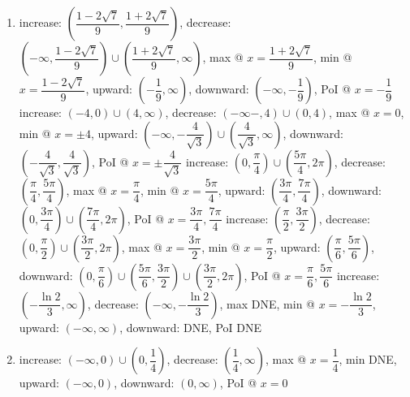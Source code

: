 \documentclass{book}
\begin{document}
\begin{appendices}
\begin{enumerate}[!HW!]
\itemspade increase: $(-\infty,-4)\cup(3,\infty)$,  decrease: $(-4,3)$, max @ $x=-4$, min @ $x=3$, upward: $\left(-\dfrac{1}{2},\infty\right)$, downward: $\left(-\infty,-\dfrac{1}{2}\right)$, PoI @ $x=-\dfrac{1}{2}$
\itemspade increase: $(-\infty,-2)\cup(1,\infty)$,  decrease: $(-2,1)$, max @ $x=-2$, min @ $x=1$, upward: $\left(-\dfrac{1}{2},\infty\right)$, downward: $\left(-\infty,-\dfrac{1}{2}\right)$, PoI @ $x=-\dfrac{1}{2}$
\item increase: $\left(\dfrac{1-2\sqrt{7}}{9},\dfrac{1+2\sqrt{7}}{9}\right)$, decrease: $\left(-\infty,\dfrac{1-2\sqrt{7}}{9}\right)\cup\left(\dfrac{1+2\sqrt{7}}{9},\infty\right)$, max @ $x=\dfrac{1+2\sqrt{7}}{9}$, min @ $x=\dfrac{1-2\sqrt{7}}{9}$, upward: $\left(-\dfrac{1}{9},\infty\right)$, downward: $\left(-\infty,-\dfrac{1}{9}\right)$, PoI @ $x=-\dfrac{1}{9}$
\itemspade increase: $(-4,0)\cup(4,\infty)$,  decrease: $(-\infty-,4)\cup(0,4)$, max @ $x=0$, min @ $x=\pm4$, upward: $\left(-\infty,-\dfrac{4}{\sqrt{3}}\right)\cup\left(\dfrac{4}{\sqrt{3}},\infty\right)$, downward: $\left(-\dfrac{4}{\sqrt{3}},\dfrac{4}{\sqrt{3}}\right)$, PoI @ $x=\pm\dfrac{4}{\sqrt{3}}$
\itemspade increase: $\left(0,\dfrac{\pi}{4}\right)\cup\left(\dfrac{5\pi}{4},2\pi\right)$,  decrease: $\left(\dfrac{\pi}{4},\dfrac{5\pi}{4}\right)$, max @ $x=\dfrac{\pi}{4}$, min @ $x=\dfrac{5\pi}{4}$, upward: $\left(\dfrac{3\pi}{4},\dfrac{7\pi}{4}\right)$, downward: $\left(0,\dfrac{3\pi}{4}\right)\cup\left(\dfrac{7\pi}{4},2\pi\right)$, PoI @ $x=\dfrac{3\pi}{4}, \dfrac{7\pi}{4}$
\itemspade increase: $\left(\dfrac{\pi}{2},\dfrac{3\pi}{2}\right)$,  decrease: $\left(0, \dfrac{\pi}{2}\right)\cup\left(\dfrac{3\pi}{2},2\pi\right)$, max @ $x=\dfrac{3\pi}{2}$, min @ $x=\dfrac{\pi}{2}$, upward: $\left(\dfrac{\pi}{6},\dfrac{5\pi}{6}\right)$, downward: $\left(0,\dfrac{\pi}{6}\right)\cup\left(\dfrac{5\pi}{6},\dfrac{3\pi}{2}\right)\cup\left(\dfrac{3\pi}{2},2\pi\right)$, PoI @ $x=\dfrac{\pi}{6}, \dfrac{5\pi}{6}$
\itemspade increase: $\left(-\dfrac{\ln 2}{3},\infty\right)$,  decrease: $\left(-\infty, -\dfrac{\ln 2}{3}\right)$, max  DNE, min @ $x=-\dfrac{\ln 2}{3}$, upward: $(-\infty,\infty)$, downward: DNE, PoI  DNE
\item increase: $(-\infty, 0)\cup\left(0,\dfrac{1}{4}\right)$, decrease: $\left(\dfrac{1}{4}, \infty\right)$, max @ $x=\dfrac{1}{4}$,  min  DNE, upward: $(-\infty,0)$, downward: $(0,\infty)$, PoI @ $x=0$
\end{enumerate}


\vspace{-15pt}

\rebootHW


\end{appendices}
\end{document}
